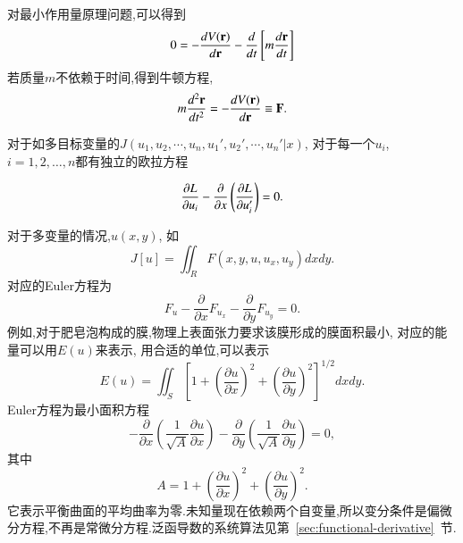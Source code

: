 对最小作用量原理问题,可以得到
$$
  0 = - \frac{d{V({\mathbf{r}})}}{d{{\mathbf{r}}}} - \frac{d{}}{d{t}} \left[ m \frac{d{\mathbf{r}}}{dt} \right]
$$
若质量$m$不依赖于时间,得到牛顿方程,
$$
  m \frac{d^2{\mathbf{r}}}{dt^2} = - \frac{d{V({\mathbf{r}})}}{d{{\mathbf{r}}}} \equiv {\mathbf{F}} .
$$

对于如多目标变量的$J(u_1, u_2, \cdots, u_n, u_1', u_2', \cdots, u_n'|x)$, 对于每一个$u_i$, $i=1,2,\dots,n$都有独立的欧拉方程

\begin{equation}
  \frac{\partial{L}}{\partial{u_i}} -  \frac{\partial{}}{\partial{x}}\left( \frac{\partial{L}}{\partial{u'_i}} \right) = 0 .
\end{equation}

对于多变量的情况,$u(x,y)$, 如
\begin{equation}
J[u]=\iint_R F\left(x, y, u, u_x, u_y\right) d x d y .
\end{equation}
对应的Euler方程为
\begin{equation}
F_u-\frac{\partial}{\partial x} F_{u_x}-\frac{\partial}{\partial y} F_{u_y}=0.
\end{equation}
例如,对于肥皂泡构成的膜,物理上表面张力要求该膜形成的膜面积最小, 对应的能量可以用$E(u)$来表示,
用合适的单位,可以表示
$$
E(u)=\iint_S\left[1+\left(\frac{\partial u}{\partial x}\right)^2+\left(\frac{\partial u}{\partial y}\right)^2\right]^{1 / 2} d x d y.
$$
Euler方程为最小面积方程
$$
-\frac{\partial}{\partial x}\left(\frac{1}{\sqrt{A}} \frac{\partial u}{\partial x}\right)-\frac{\partial}{\partial y}\left(\frac{1}{\sqrt{A}} \frac{\partial u}{\partial y}\right)=0,
$$
其中
$$
A=1+\left(\frac{\partial u}{\partial x}\right)^2+\left(\frac{\partial u}{\partial y}\right)^2.
$$
它表示平衡曲面的平均曲率为零.未知量现在依赖两个自变量,所以变分条件是偏微分方程,不再是常微分方程.泛函导数的系统算法见第~\ref{sec:functional-derivative}~节.



